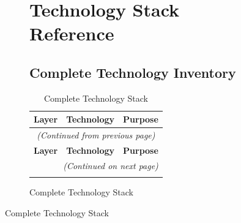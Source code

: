 \documentclass[12pt,a4paper]{report}
\begin{document}
\begin{figure}[H]
\begin{plantuml}
\begin{figure}[H]
\begin{plantuml}
\chapter{Technology Stack Reference}

\section{Complete Technology Inventory}

\begin{longtable}{|l|l|p{7cm}|}
\caption{Complete Technology Stack} \\
\hline
\textbf{Layer} & \textbf{Technology} & \textbf{Purpose} \\
\hline
\endfirsthead

\multicolumn{3}{c}{\textit{(Continued from previous page)}} \\
\hline
\textbf{Layer} & \textbf{Technology} & \textbf{Purpose} \\
\hline
\endhead

\hline \multicolumn{3}{r}{\textit{(Continued on next page)}} \\
\endfoot

\hline
\endlastfoot


\end{longtable}
\end{plantuml}
\end{figure}
\end{plantuml}
\end{figure}
\end{document}
